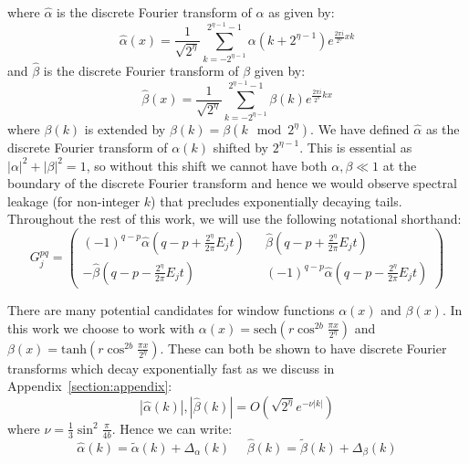 \documentclass[aps,floatfix,10pt,amssymb,amsfont,amsmath,superscriptaddress,float,nofootinbib,longbibliography,nobalancelastpage,twocolumn]{revtex4-2}
\begin{document}
\begin{widetext}
where $\hat \alpha$ is the discrete Fourier transform of $\alpha$ as given by:
\begin{equation}
   \hat\alpha(x) =\frac{1}{\sqrt{2^{\eta}}}\sum_{k=-2^{\eta-1}}^{2^{\eta-1}-1} \alpha(k+2^{\eta-1})e^{\frac{2\pi i}{2^{\eta}}xk}
\end{equation}
and $\hat \beta$ is the discrete Fourier transform of $\beta$ given by:
\begin{equation}
    \hat\beta(x) =\frac{1}{\sqrt{2^{\eta}}}\sum_{k=-2^{\eta-1}}^{2^{\eta-1}-1} \beta(k)e^{\frac{2\pi i}{2^{\eta}}kx}
\end{equation}
 where $\beta(k)$ is extended by $\beta(k) = \beta(k \mod 2^{\eta})$. We have defined $\hat \alpha$ as the discrete Fourier transform of $\alpha(k)$ shifted by $2^{\eta-1}$. This is essential as $|\alpha|^2+|\beta|^2=1$, so without this shift we cannot have both $\alpha, \beta \ll1$ at the boundary of the discrete Fourier transform and hence we would observe spectral leakage (for non-integer $k$) that precludes exponentially decaying tails. Throughout the rest of this work, we will use the following notational shorthand: 
\begin{equation}
    G_j^{pq} = \begin{pmatrix}
        (-1)^{q-p}\hat\alpha(q-p+\frac{2^{\eta}}{2\pi}E_jt) && \hat\beta(q-p+\frac{2^{\eta}}{2\pi}E_jt)\\
        -\hat\beta (q-p-\frac{2^{\eta}}{2\pi}E_jt) && (-1)^{q-p}\hat\alpha(q-p-\frac{2^{\eta}}{2\pi}E_jt)
    \end{pmatrix}
\end{equation}
\end{widetext}
There are many potential candidates for window functions $\alpha(x)$ and $\beta(x)$. In this work we choose to work with $\alpha(x) = \text{sech}( r\cos^{2b} \frac{\pi x}{2^{\eta}})$ and $\beta(x) = \text{tanh}(r \cos^{2b} \frac{\pi x}{2^{\eta}})$. These can both be shown to have discrete Fourier transforms which decay exponentially fast as we discuss in Appendix~\ref{section:appendix}:
\begin{equation}
    |\hat \alpha(k)|,|\hat \beta(k)| = O\left( \sqrt{2^{\eta}}e^{-\nu |k|}\right)
    \label{eq:scaling}
\end{equation}
where $\nu = \frac{1}{3}\sin^2\frac{\pi}{4b}$. Hence we can write:
\begin{equation}
    \hat\alpha(k) = \tilde\alpha(k) + \Delta_{\alpha}(k) \>\>\>\>\>\>\hat\beta(k) = \tilde\beta(k) + \Delta_{\beta}(k)
    \label{eq:decomposealpha}
\end{equation}
\end{document}
